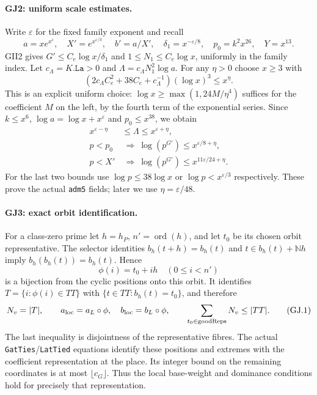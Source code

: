 \documentclass[11pt,a4paper]{article}
\numberwithin{equation}{section}
\theoremstyle{remark}\newtheorem{remark}[theorem]{Remark}
\begin{document}
\paragraph{GJ2: uniform scale estimates.}
Write $\varepsilon$ for the fixed family exponent and recall
\[
 a=x e^{x^\varepsilon},\quad X'=e^{x^{\varepsilon/3}},\quad
 b'=a/X',\quad \delta_1=x^{-\varepsilon/8},\quad
 p_0=k^2x^{26},\quad Y=x^{13}.
\]
GII2 gives $G'\le C_e\log x/\delta_1$ and
$1\le N_1\le C_e\log x$, uniformly in the family index.
Let $c_\Lambda=K.\texttt{La}>0$ and
$\Lambda=c_\Lambda N_1^2\log a$. For any $\eta>0$ choose $x\ge3$ with
\[
 \left(2c_\Lambda C_e^2+38C_e+c_\Lambda^{-1}\right)(\log x)^3
 \le x^\eta.
\]
This is an explicit uniform choice: $\log x\ge
\max(1,24M/\eta^4)$ suffices for the coefficient $M$ on the left,
by the fourth term of the exponential series. Since $k\le x^6$,
$\log a=\log x+x^\varepsilon$ and $p_0\le x^{38}$, we obtain
\begin{align*}
 x^{\varepsilon-\eta}&\le\Lambda\le x^{\varepsilon+\eta},\\
 p<p_0&\ \Longrightarrow\ \log(p^{G'})\le x^{\varepsilon/8+\eta},\\
 p<X'&\ \Longrightarrow\ \log(p^{G'})\le x^{11\varepsilon/24+\eta}.
\end{align*}
For the last two bounds use $\log p\le38\log x$ or
$\log p<x^{\varepsilon/3}$ respectively. These prove the actual
\texttt{adm5} fields; later we use $\eta=\varepsilon/48$.

\paragraph{GJ3: exact orbit identification.}
For a class-zero prime let $h=h_P$, $n'=\operatorname{ord}(h)$,
and let $t_0$ be its chosen orbit representative. The selector identities
$b_h(t+h)=b_h(t)$ and $t\in b_h(t)+\mathbb Nh$ imply
$b_h(b_h(t))=b_h(t)$. Hence
\[
 \phi(i)=t_0+ih\quad(0\le i<n')
\]
is a bijection from the cyclic positions onto this orbit. It identifies
$T=\{i:\phi(i)\in TT\}$ with $\{t\in TT:b_h(t)=t_0\}$, and therefore
\[
 N_v=|T|,\qquad a_{\rm loc}=a_L\circ\phi,\quad
 b_{\rm loc}=b_L\circ\phi,\qquad
 \sum_{t_0\in\mathrm{goodReps}}N_v\le|TT|. \tag{GJ.1}
\]
The last inequality is disjointness of the representative fibres.
The actual \texttt{GatTies}/\texttt{LatTied} equations identify these
positions and extremes with the coefficient representation at the place.
Its integer bound on the remaining coordinates is at most
$\lfloor c_G\rfloor$. Thus the local base-weight and dominance conditions
hold for precisely that representation.
\end{document}
